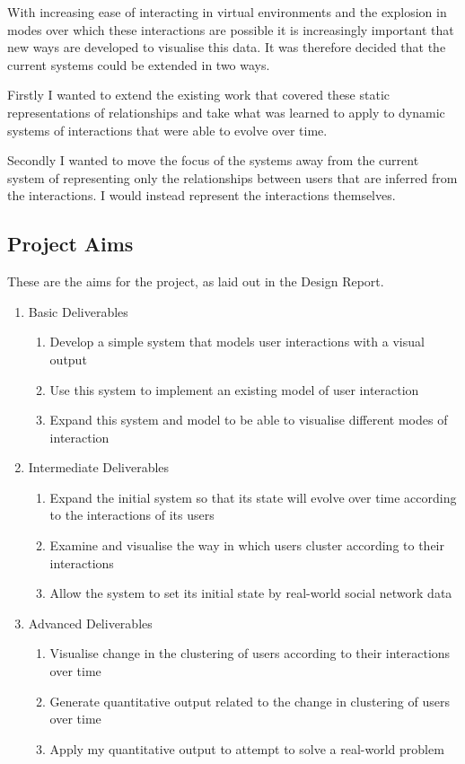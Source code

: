 \documentclass[12pt,a4paper]{article}
\begin{document}
With increasing ease of interacting in virtual environments and the explosion in modes over which these interactions are possible it is increasingly important that new ways are developed to visualise this data. It was therefore decided that the current systems could be extended in two ways.

Firstly I wanted to extend the existing work that covered these static representations of relationships and take what was learned to apply to dynamic systems of interactions that were able to evolve over time.

Secondly I wanted to move the focus of the systems away from the current system of representing only the relationships between users that are inferred from the interactions. I would instead represent the interactions themselves.

\subsection{Project Aims}

These are the aims for the project, as laid out in the Design Report.

\begin{enumerate}
\item Basic Deliverables
\begin{enumerate}
\item Develop a simple system that models user interactions with a visual output
\item Use this system to implement an existing model of user interaction
\item Expand this system and model to be able to visualise different modes of interaction
\end{enumerate}
\item Intermediate Deliverables
\begin{enumerate}
\item Expand the initial system so that its state will evolve over time according to the interactions of its users
\item Examine and visualise the way in which users cluster according to their interactions
\item Allow the system to set its initial state by real-world social network data
\end{enumerate}
\item Advanced Deliverables
\begin{enumerate}
\item Visualise change in the clustering of users according to their interactions over time
\item Generate quantitative output related to the change in clustering of users over time
\item Apply my quantitative output to attempt to solve a real-world problem
\end{enumerate}
\end{enumerate}
\end{document}
